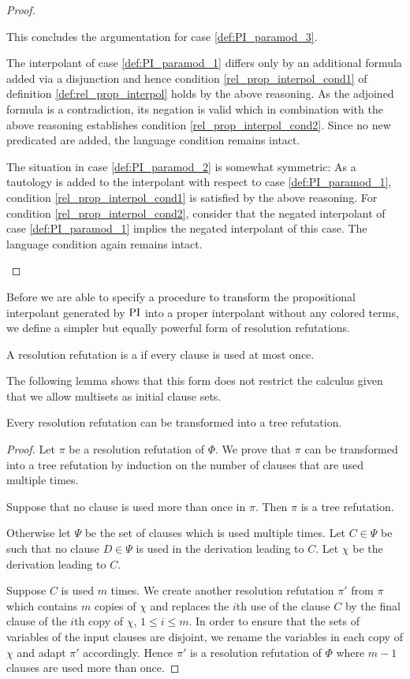 \begin{proof}
\begin{itemize}
			This concludes the argumentation for case \ref{def:PI_paramod_3}. 

			The interpolant of case \ref{def:PI_paramod_1} differs only by an additional formula added via a disjunction and hence condition \ref{rel_prop_interpol_cond1} of definition \ref{def:rel_prop_interpol} holds by the above reasoning.
			As the adjoined formula is a contradiction, its negation is valid which in combination with the above reasoning establishes condition \ref{rel_prop_interpol_cond2}.
			Since no new predicated are added, the language condition remains intact. 

			The situation in case \ref{def:PI_paramod_2} is somewhat symmetric: 
			As a tautology is added to the interpolant with respect to case \ref{def:PI_paramod_1}, condition \ref{rel_prop_interpol_cond1} is satisfied by the above reasoning.
			For condition \ref{rel_prop_interpol_cond2}, consider that the negated interpolant of case \ref{def:PI_paramod_1} implies the negated interpolant of this case.
			The language condition again remains intact.
			\qedhere
	\end{itemize}
\end{proof}

Before we are able to specify a procedure to transform the propositional interpolant generated by $\operatorname{PI}$ into a proper interpolant without any colored terms, we define a simpler but equally powerful form of resolution refutations.

\begin{defi}
	A resolution refutation is a  if every clause is used at most once.
\end{defi}

The following lemma shows that this form does not restrict the calculus given that we allow multisets as initial clause sets.
\begin{lemma}
	\label{lemma:bin_tree_deduction}
	Every resolution refutation can be transformed into a tree refutation. 
\end{lemma}
\begin{proof}
	Let $\pi$ be a resolution refutation of $\Phi$.
	We prove that $\pi$ can be transformed into a tree refutation by induction on the number of clauses that are used multiple times.

	Suppose that no clause is used more than once in $\pi$. Then $\pi$ is a tree refutation.

	Otherwise let $\Psi$ be the set of clauses which is used multiple times.
	Let $C \in \Psi$ be such that no clause $D \in \Psi$ is used in the derivation leading to $C$. 
	Let $\chi$ be the derivation leading to $C$.

	Suppose $C$ is used $m$ times.
	We create another resolution refutation $\pi'$ from $\pi$ which contains $m$ copies of $\chi$ and replaces the $i$th use of the clause $C$ by the final clause of the $i$th copy of $\chi$, $1 \leq i \leq m$.
	In order to ensure that the sets of variables of the input clauses are disjoint, we rename the variables in each copy of $\chi$ and adapt $\pi'$ accordingly.
	Hence $\pi'$ is a resolution refutation of $\Phi$ where $m-1$ clauses are used more than once.
\end{proof}

